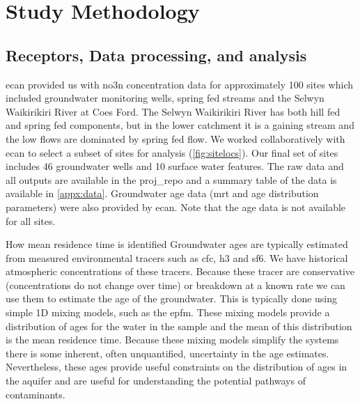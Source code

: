 \section[Methods]{Study Methodology}   \label{sec:methods}
\subsection[Data Processing]{Receptors, Data processing, and analysis} \label{sec:data}

\gls{ecan} provided us with \gls{no3n} concentration data for approximately 100 sites which included groundwater monitoring wells, spring fed streams and the Selwyn Waikirikiri River at Coes Ford.
The Selwyn Waikirikiri River has both hill fed and spring fed components, but in the lower catchment it is a gaining stream and the low flows are dominated by spring fed flow.
We worked collaboratively with \gls{ecan} to select a subset of sites for analysis (\autoref{fig:sitelocs}).
Our final set of sites includes 46 groundwater wells and 10 surface water features.
The raw data and all outputs are available in the \gls{proj_repo} and a summary table of the data is available in \autoref{appx:data}.
Groundwater age data (\gls{mrt} and age distribution parameters) were also provided by \gls{ecan}.
Note that the age data is not available for all sites.

\begin{breakawaybox}[label={box:mrt}]{How mean residence time is identified}
    Groundwater ages are typically estimated from measured environmental tracers such as \gls{cfc}, \gls{h3} and \gls{sf6}.
    We have historical atmospheric concentrations of these tracers.
    Because these tracer are conservative (concentrations do not change over time) or breakdown at a known rate we can use them to estimate the age of the groundwater. This is typically done using simple 1D mixing models, such as the \gls{epfm}.
    These mixing models provide a distribution of ages for the water in the sample and the mean of this distribution is the mean residence time.
    Because these mixing models simplify the systems there is some inherent, often unquantified, uncertainty in the age estimates.
    Nevertheless, these ages provide useful constraints on the distribution of ages in the aquifer and are useful for understanding the potential pathways of contaminants.

\end{breakawaybox}

